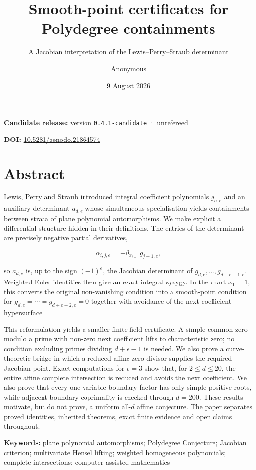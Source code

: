 \documentclass[
]{article}
\title{Smooth-point certificates for Polydegree containments}
\subtitle{A Jacobian interpretation of the Lewis--Perry--Straub
determinant}
\author{Anonymous}
\date{9 August 2026}
\begin{document}
\maketitle

{
\setcounter{tocdepth}{1}
\tableofcontents
}
\textbf{Candidate release:} version \texttt{0.4.1-candidate} ·
unrefereed

\textbf{DOI:}
\href{https://doi.org/10.5281/zenodo.21864574}{10.5281/zenodo.21864574}

\section*{Abstract}\label{abstract}

Lewis, Perry and Straub introduced integral coefficient polynomials
\(g_{n,e}\) and an auxiliary determinant \(a_{d,e}\) whose simultaneous
specialisation yields containments between strata of plane polynomial
automorphisms. We make explicit a differential structure hidden in their
definitions. The entries of the determinant are precisely negative
partial derivatives,

\[
\alpha_{i,j,e}=-\partial_{x_{i+1}}g_{j+1,e},
\]

so \(a_{d,e}\) is, up to the sign \((-1)^e\), the Jacobian determinant
of \(g_{d,e},\ldots,g_{d+e-1,e}\). Weighted Euler identities then give
an exact integral syzygy. In the chart \(x_1=1\), this converts the
original non-vanishing condition into a smooth-point condition for
\(g_{d,e}=\cdots=g_{d+e-2,e}=0\) together with avoidance of the next
coefficient hypersurface.

This reformulation yields a smaller finite-field certificate. A simple
common zero modulo a prime with non-zero next coefficient lifts to
characteristic zero; no condition excluding primes dividing \(d+e-1\) is
needed. We also prove a curve-theoretic bridge in which a reduced affine
zero divisor supplies the required Jacobian point. Exact computations
for \(e=3\) show that, for \(2\le d\le20\), the entire affine complete
intersection is reduced and avoids the next coefficient. We also prove
that every one-variable boundary factor has only simple positive roots,
while adjacent boundary coprimality is checked through \(d=200\). These
results motivate, but do not prove, a uniform all-\(d\) affine
conjecture. The paper separates proved identities, inherited theorems,
exact finite evidence and open claims throughout.

\textbf{Keywords:} plane polynomial automorphisms; Polydegree
Conjecture; Jacobian criterion; multivariate Hensel lifting; weighted
homogeneous polynomials; complete intersections; computer-assisted
mathematics
\end{document}
